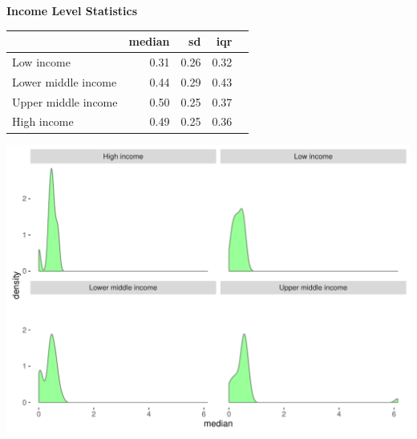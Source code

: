 \documentclass{article}\usepackage[]{graphicx}\usepackage[]{color}
\makeatletter
\def\maxwidth{ %
  \ifdim\Gin@nat@width>\linewidth
    \linewidth
  \else
    \Gin@nat@width
  \fi
}
\makeatother
\begin{document}
\newpage

  \raggedright{\color{white!30!black} \textbf{\Large Income Level Statistics}}
    \begin{minipage}[c]{0.99\textwidth}  
      \vspace*{0.4cm}
      
\begin{tabular}{lrrrl}
  & median & sd & iqr &  \\ 
  \hline
Low income & 0.31 & 0.26 & 0.32 &  \\ 
  Lower middle income & 0.44 & 0.29 & 0.43 &  \\ 
  Upper middle income & 0.50 & 0.25 & 0.37 &  \\ 
  High income & 0.49 & 0.25 & 0.36 &  \\ 
  \end{tabular}

      \vspace*{1cm}
    \end{minipage}
    
    \begin{minipage}[c]{0.99\textwidth}  
    


{\centering \includegraphics[width=\maxwidth]{figure/plot3-1} 

}



      \vspace*{0.5cm}
    \end{minipage}
\end{document}
